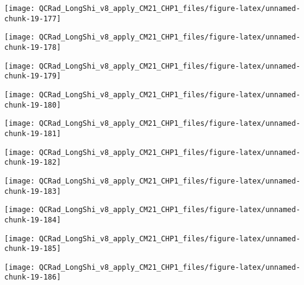 \documentclass[
  10pt,
  a4paper,oneside]{article}
\begin{document}
\begin{center}\texttt{[image: QCRad\_LongShi\_v8\_apply\_CM21\_CHP1\_files/figure-latex/unnamed-chunk-19-177]} \end{center}

\begin{center}\texttt{[image: QCRad\_LongShi\_v8\_apply\_CM21\_CHP1\_files/figure-latex/unnamed-chunk-19-178]} \end{center}

\begin{center}\texttt{[image: QCRad\_LongShi\_v8\_apply\_CM21\_CHP1\_files/figure-latex/unnamed-chunk-19-179]} \end{center}

\begin{center}\texttt{[image: QCRad\_LongShi\_v8\_apply\_CM21\_CHP1\_files/figure-latex/unnamed-chunk-19-180]} \end{center}

\begin{center}\texttt{[image: QCRad\_LongShi\_v8\_apply\_CM21\_CHP1\_files/figure-latex/unnamed-chunk-19-181]} \end{center}

\begin{center}\texttt{[image: QCRad\_LongShi\_v8\_apply\_CM21\_CHP1\_files/figure-latex/unnamed-chunk-19-182]} \end{center}

\begin{center}\texttt{[image: QCRad\_LongShi\_v8\_apply\_CM21\_CHP1\_files/figure-latex/unnamed-chunk-19-183]} \end{center}

\begin{center}\texttt{[image: QCRad\_LongShi\_v8\_apply\_CM21\_CHP1\_files/figure-latex/unnamed-chunk-19-184]} \end{center}

\begin{center}\texttt{[image: QCRad\_LongShi\_v8\_apply\_CM21\_CHP1\_files/figure-latex/unnamed-chunk-19-185]} \end{center}

\begin{center}\texttt{[image: QCRad\_LongShi\_v8\_apply\_CM21\_CHP1\_files/figure-latex/unnamed-chunk-19-186]} \end{center}
\end{document}
